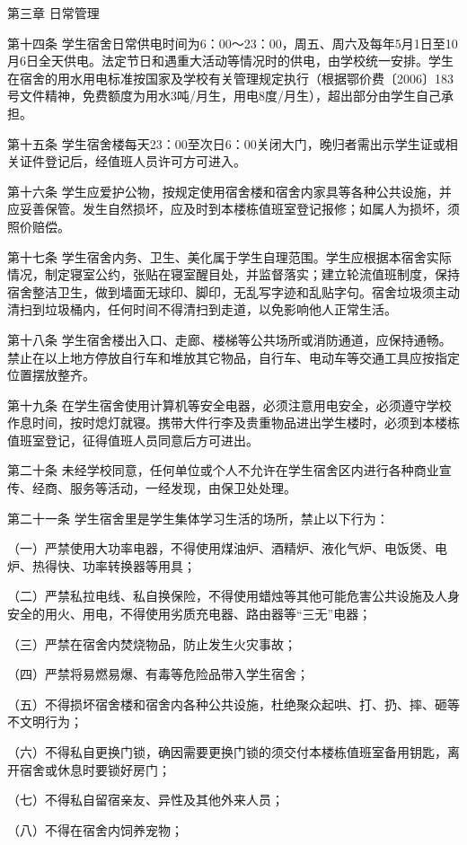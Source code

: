\documentclass[UTF8,12pt,a4paper]{report}
\begin{document}
第三章 日常管理

第十四条 学生宿舍日常供电时间为6：00～23：00，周五、周六及每年5月1日至10月6日全天供电。法定节日和遇重大活动等情况时的供电，由学校统一安排。学生在宿舍的用水用电标准按国家及学校有关管理规定执行（根据鄂价费〔2006〕183号文件精神，免费额度为用水3吨/月生，用电8度/月生），超出部分由学生自己承担。

第十五条 学生宿舍楼每天23：00至次日6：00关闭大门，晚归者需出示学生证或相关证件登记后，经值班人员许可方可进入。

第十六条 学生应爱护公物，按规定使用宿舍楼和宿舍内家具等各种公共设施，并应妥善保管。发生自然损坏，应及时到本楼栋值班室登记报修；如属人为损坏，须照价赔偿。

第十七条 学生宿舍内务、卫生、美化属于学生自理范围。学生应根据本宿舍实际情况，制定寝室公约，张贴在寝室醒目处，并监督落实；建立轮流值班制度，保持宿舍整洁卫生，做到墙面无球印、脚印，无乱写字迹和乱贴字句。宿舍垃圾须主动清扫到垃圾桶内，任何时间不得清扫到走道，以免影响他人正常生活。

第十八条 学生宿舍楼出入口、走廊、楼梯等公共场所或消防通道，应保持通畅。禁止在以上地方停放自行车和堆放其它物品，自行车、电动车等交通工具应按指定位置摆放整齐。

第十九条 在学生宿舍使用计算机等安全电器，必须注意用电安全，必须遵守学校作息时间，按时熄灯就寝。携带大件行李及贵重物品进出学生楼时，必须到本楼栋值班室登记，征得值班人员同意后方可进出。

第二十条 未经学校同意，任何单位或个人不允许在学生宿舍区内进行各种商业宣传、经商、服务等活动，一经发现，由保卫处处理。

第二十一条 学生宿舍里是学生集体学习生活的场所，禁止以下行为：

（一）严禁使用大功率电器，不得使用煤油炉、酒精炉、液化气炉、电饭煲、电炉、热得快、功率转换器等用具；

（二）严禁私拉电线、私自换保险，不得使用蜡烛等其他可能危害公共设施及人身安全的用火、用电，不得使用劣质充电器、路由器等“三无”电器；

（三）严禁在宿舍内焚烧物品，防止发生火灾事故；

（四）严禁将易燃易爆、有毒等危险品带入学生宿舍；

（五）不得损坏宿舍楼和宿舍内各种公共设施，杜绝聚众起哄、打、扔、摔、砸等不文明行为；

（六）不得私自更换门锁，确因需要更换门锁的须交付本楼栋值班室备用钥匙，离开宿舍或休息时要锁好房门；

（七）不得私自留宿亲友、异性及其他外来人员；

（八）不得在宿舍内饲养宠物；
\end{document}
